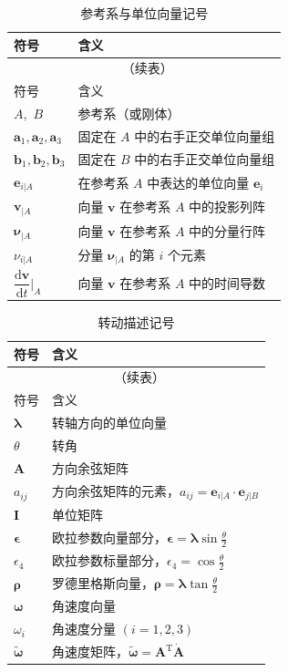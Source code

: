 \begin{longtable}{ll}
\caption{参考系与单位向量记号}\label{tab:符号说明:参考系}\\
\toprule
符号 & 含义 \\
\midrule
\endfirsthead
\multicolumn{2}{c}{\tablename~\thetable{}（续表）}\\
\toprule
符号 & 含义 \\
\midrule
\endhead
$A$,\, $B$ & 参考系（或刚体） \\
$\mathbf{a}_1,\mathbf{a}_2,\mathbf{a}_3$ & 固定在 $A$ 中的右手正交单位向量组 \\
$\mathbf{b}_1,\mathbf{b}_2,\mathbf{b}_3$ & 固定在 $B$ 中的右手正交单位向量组 \\
$\mathbf{e}_{i|A}$ & 在参考系 $A$ 中表达的单位向量 $\mathbf{e}_i$ \\
$\mathbf{v}_{|A}$ & 向量 $\bm{v}$ 在参考系 $A$ 中的投影列阵 \\
$\bm{\nu}_{|A}$ & 向量 $\bm{v}$ 在参考系 $A$ 中的分量行阵 \\
$\nu_{i|A}$ & 分量 $\bm{\nu}_{|A}$ 的第 $i$ 个元素 \\
$\dfrac{\mathrm{d}\bm{v}}{\mathrm{d}t}\Big|_{A}$ & 向量 $\bm{v}$ 在参考系 $A$ 中的时间导数 \\
\bottomrule
\end{longtable}

\begin{longtable}{ll}
\caption{转动描述记号}\label{tab:符号说明:转动}\\
\toprule
符号 & 含义 \\
\midrule
\endfirsthead
\multicolumn{2}{c}{\tablename~\thetable{}（续表）}\\
\toprule
符号 & 含义 \\
\midrule
\endhead
$\bm{\lambda}$ & 转轴方向的单位向量 \\
$\theta$ & 转角 \\
$\bm{A}$ & 方向余弦矩阵 \\
$a_{ij}$ & 方向余弦矩阵的元素，$a_{ij}=\mathbf{e}_{i|A}\cdot\mathbf{e}_{j|B}$ \\
$\bm{I}$ & 单位矩阵 \\
$\bm{\epsilon}$ & 欧拉参数向量部分，$\bm{\epsilon}=\bm{\lambda}\sin\frac{\theta}{2}$ \\
$\epsilon_{4}$ & 欧拉参数标量部分，$\epsilon_{4}=\cos\frac{\theta}{2}$ \\
$\bm{\rho}$ & 罗德里格斯向量，$\bm{\rho}=\bm{\lambda}\tan\frac{\theta}{2}$ \\
$\bm{\omega}$ & 角速度向量 \\
$\omega_i$ & 角速度分量 $(i=1,2,3)$ \\
$\bm{\tilde{\omega}}$ & 角速度矩阵，$\bm{\tilde{\omega}}=\bm{A}^{\mathrm{T}}\dot{\bm{A}}$ \\
\bottomrule
\end{longtable}

